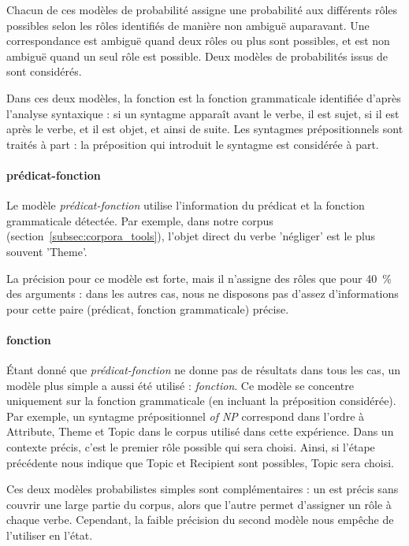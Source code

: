 Chacun de ces modèles de probabilité assigne une probabilité aux différents
rôles possibles selon les rôles identifiés de manière non ambiguë auparavant.
Une correspondance est ambiguë quand deux rôles ou plus sont possibles, et est
non ambiguë quand un seul rôle est possible. Deux modèles de probabilités issus
de \citep{swier2005exploiting} sont considérés.


Dans ces deux modèles, la fonction est la fonction grammaticale identifiée
d'après l'analyse syntaxique : si un syntagme apparaît avant le verbe, il est
sujet, si il est après le verbe, et il est objet, et ainsi de suite. Les
syntagmes prépositionnels sont traités à part : la préposition qui introduit le
syntagme est considérée à part.

\paragraph{prédicat-fonction}

Le modèle \emph{prédicat-fonction} utilise l'information du prédicat et la
fonction grammaticale détectée. Par exemple, dans notre corpus
(section~\ref{subsec:corpora_tools}), l'objet direct du verbe 'négliger' est le
plus souvent 'Theme'.

La précision pour ce modèle est forte, mais il n'assigne des rôles que pour
40~\% des arguments : dans les autres cas, nous ne disposons pas d'assez
d'informations pour cette paire (prédicat, fonction grammaticale) précise.

\paragraph{fonction}

Étant donné que \emph{prédicat-fonction} ne donne pas de résultats dans tous les
cas, un modèle plus simple a aussi été utilisé : \emph{fonction}. Ce modèle se
concentre uniquement sur la fonction grammaticale (en incluant la préposition
considérée). Par exemple, un syntagme prépositionnel \emph{of NP} correspond
dans l'ordre à Attribute, Theme et Topic dans le corpus utilisé dans cette
expérience. Dans un contexte précis, c'est le premier rôle possible qui sera
choisi. Ainsi, si l'étape précédente nous indique que Topic et Recipient sont
possibles, Topic sera choisi.

Ces deux modèles probabilistes simples sont complémentaires : un est précis
sans couvrir une large partie du corpus, alors que l'autre permet d'assigner un
rôle à chaque verbe. Cependant, la faible précision du second modèle nous
empêche de l'utiliser en l'état. %

